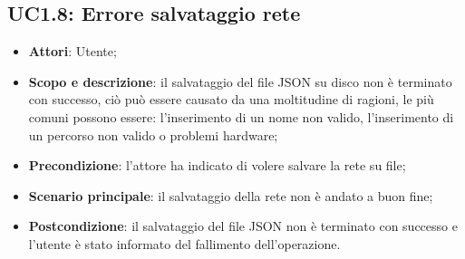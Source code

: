 \subsection{UC1.8: Errore salvataggio rete} 
\hypertarget{UC1.8}{} 
\begin{itemize} 
	\item{\textbf{Attori}: Utente;} 
	\item{\textbf{Scopo e descrizione}: il salvataggio del file JSON su disco non è terminato con successo, ciò può essere causato da una moltitudine di ragioni, le più comuni possono essere: l'inserimento di un nome non valido, l'inserimento di un percorso non valido o problemi hardware;} 
	\item{\textbf{Precondizione}: l'attore ha indicato di volere salvare la rete su file;} 
	\item{\textbf{Scenario principale}: il salvataggio della rete non è andato a buon fine;}
	\item{\textbf{Postcondizione}: il salvataggio del file JSON non è terminato con successo e l'utente è stato informato del fallimento dell'operazione.} 
\end{itemize}
